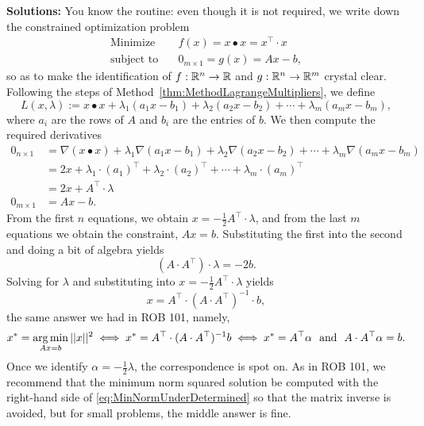 \textbf{Solutions:} You know the routine: even though it is not required, we write down the constrained optimization problem 
\begin{align*}
\text{Minimize} \quad & f(x)=x \bullet x = x^\top \cdot x\\
\text{subject to} \quad & 0_{m \times 1} = g(x) = Ax -b,
\end{align*}
so as to make the identification of $f:\mathbb R^n \to \mathbb R$ and $g:\mathbb R^n \to \mathbb R^m$ crystal clear. Following the steps of Method~\ref{thm:MethodLagrangeMultipliers}, we define
$$L(x, \lambda):=x \bullet x + \lambda_1   (a_1 x - b_1) +  \lambda_2  (a_2 x - b_2) + \cdots + \lambda_m   (a_m x - b_m),$$
where $a_i$ are the rows of $A$ and $b_i$ are the entries of $b$. We then compute the required derivatives
\begin{align*}
     0_{n \times 1} & =\nabla (x \bullet  x) +  \lambda_1   \nabla (a_1 x - b_1) +  \lambda_2 \nabla  (a_2 x - b_2) + \cdots + \lambda_m   \nabla (a_m x - b_m) \\[1em]
     &= 2x +  \lambda_1 \cdot (a_1)^\top  +  \lambda_2 \cdot (a_2)^\top  + \cdots + \lambda_m   \cdot (a_m)^\top \\[1em]
     &= 2 x + A^\top  \cdot \lambda      \\[1em]
     0_{m\times 1} & = Ax - b.
\end{align*}
From the first $n$ equations, we obtain $x = -\frac{1}{2} A^\top \cdot \lambda$, and from the last $m$ equations we obtain the constraint, $Ax=b$. Substituting the first into the second and doing a bit of algebra yields
$$  \left(A \cdot A^\top \right) \cdot \lambda = -2 b.$$
Solving for $\lambda$ and substituting into $x = -\frac{1}{2} A^\top \cdot \lambda$ yields
$$ x = A^\top \cdot  \left(A \cdot A^\top \right)^{-1} \cdot b,$$
the same answer we had in ROB 101, namely,
\begin{equation}
\label{eq:MinNormUnderDetermined}
    x^\ast = \operatorname*{arg\,min}_{Ax=b} ||x||^2 \iff x^\ast = A^\top\cdot (A \cdot A^\top)^{-1} b 
    \iff x^\ast = A^\top \alpha~~\text{and}~~A\cdot A^\top \alpha =b.
\end{equation}
Once we identify $\alpha = -\frac{1}{2} \lambda$, the correspondence is spot on. As in ROB 101, we recommend that the minimum norm squared solution be computed with the right-hand side of \eqref{eq:MinNormUnderDetermined} so that the matrix inverse is avoided, but for small problems, the middle answer is fine.
\Qed



